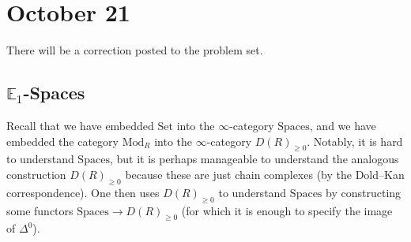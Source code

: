 \documentclass[../notes.tex]{subfiles}
\begin{document}
\section{October 21}
There will be a correction posted to the problem set.

\subsection{\texorpdfstring{$\mathbb E_1$}{ E1}-Spaces}
Recall that we have embedded $\mathrm{Set}$ into the $\infty$-category $\mathrm{Spaces}$, and we have embedded the category $\mathrm{Mod}_R$ into the $\infty$-category $D(R)_{\ge0}$. Notably, it is hard to understand $\mathrm{Spaces}$, but it is perhaps manageable to understand the analogous construction $D(R)_{\ge0}$ because these are just chain complexes (by the Dold--Kan correspondence). One then uses $D(R)_{\ge0}$ to understand $\mathrm{Spaces}$ by constructing some functors $\mathrm{Spaces}\to D(R)_{\ge0}$ (for which it is enough to specify the image of $\Delta^0$).
\end{document}
